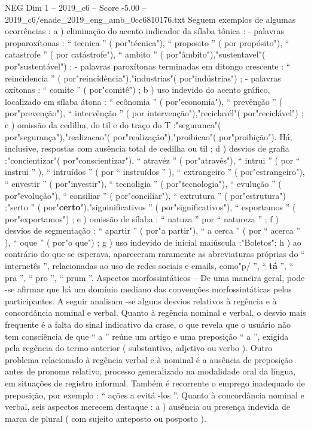 \begin{textsample}{NEG Dim 1 – 2019\_c6 – Score -5.00 – 2019\_c6/enade\_2019\_eng\_amb\_0cc6810176.txt}
Seguem exemplos de algumas ocorrências : a ) eliminação do acento indicador da sílaba tônica : - palavras proparoxítonas : “ tecnica ” ( por"técnica"), “ proposito ” ( por propósito"), “ catastrofe ” ( por catástrofe"), “ ambito ” ( por"âmbito"),"sustentavel"( por"sustentável") ; - palavras paroxítonas terminadas em ditongo crescente : “ reincidencia ” ( por"reincidência"),"industrias"( por"indústrias") ; - palavras oxítonas : “ comite ” ( por"comitê") ; b ) uso indevido do acento gráfico, localizado em sílaba átona : “ ecônomia ” ( por"economia"), “ prevênção ” ( por"prevenção"), “ intervênção ” ( por intervenção"),"reciclavél"( por"reciclável") ; c ) omissão da cedilha, do til e do traço do T :"seguranca"( por"segurança"),"realizacao"( por"realização"),"proibicao"( por"proibição").
Há, inclusive, respostas com ausência total de cedilha ou til ; d ) desvios de grafia :"concientizar"( por"conscientizar"), “ atravéz ” ( por"através"), “ intrui ” ( por “ instrui ” ), “ intruídos ” ( por “ instruídos ” ), “ extrangeiro ” ( por"estrangeiro"), “ envestir ” ( por"investir"), “ tecnoligia ” ( por"tecnologia"), “ evulução ” ( por"evolução"), “ consiliar ” ( por"conciliar"), “ extrutura ” ( por"estrutura") ;"serto ” ( por"\textbf{certo}"),"siguinificativos ” ( por"significativos"), “ esportamos ” ( por"exportamos") ; e ) omissão de sílaba : “ natuza ” por “ natureza ” ; f ) desvios de segmentação : “ apartir ” ( por"a partir"), “ a cerca ” ( por “ acerca ” ), “ oque ” ( por"o que") ; g ) uso indevido de inicial maiúscula :"Boletos"; h ) ao contrário do que se esperava, apareceram raramente as abreviaturas próprias do “ internetês ”, relacionadas ao uso de redes sociais e emails, como"p/ ”, “ \textbf{tá} ”, “ pra ”, “ pro ”, “ prum ”.
Aspectos morfossintáticos – De uma maneira geral, pode -se afirmar que há um domínio mediano das convenções morfossintáticas pelos participantes.
A seguir analisam -se alguns desvios relativos à regência e à concordância nominal e verbal.
Quanto à regência nominal e verbal, o desvio mais frequente é a falta do sinal indicativo da crase, o que revela que o usuário não tem consciência de que “ a ” reúne um artigo e uma preposição “ a ”, exigida pela regência do termo anterior ( substantivo, adjetivo ou verbo ).
Outro problema relacionado à regência verbal e à nominal é a ausência de preposição antes de pronome relativo, processo generalizado na modalidade oral da língua, em situações de registro informal.
Também é recorrente o emprego inadequado de preposição, por exemplo : “ ações a evitá -los ”.
Quanto à concordância nominal e verbal, seis aspectos merecem destaque : a ) ausência ou presença indevida de marca de plural ( com sujeito anteposto ou posposto ).

\end{textsample}
